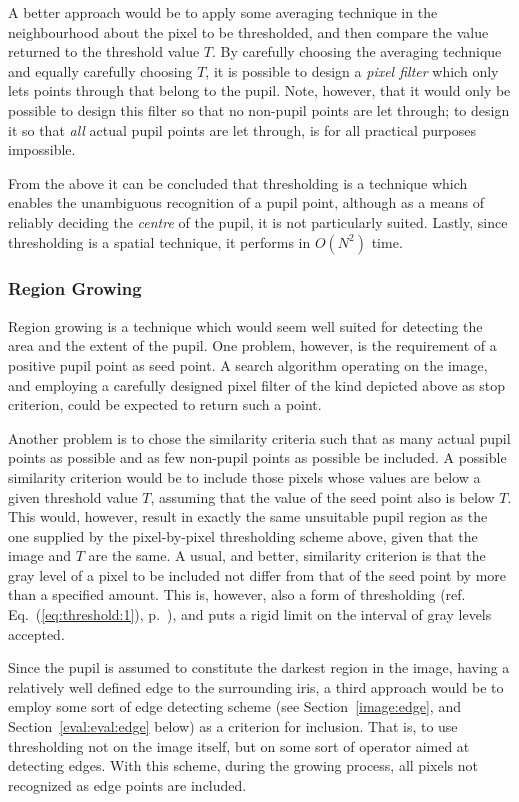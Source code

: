 A better approach would be to apply some averaging technique in the
neighbourhood about the pixel to be thresholded, and then compare the
value returned to the threshold value $T$.  By carefully choosing the
averaging technique and equally carefully choosing $T$, it is possible
to design a {\em pixel filter\/} which only lets points through that
belong to the pupil.  Note, however, that it would only be possible to
design this filter so that no non-pupil points are let through; to
design it so that {\em all\/} actual pupil points are let through, is
for all practical purposes impossible.

From the above it can be concluded that thresholding is a technique
which enables the unambiguous recognition of a pupil point, although
as a means of reliably deciding the {\em centre\/} of the pupil, it is
not particularly suited.  Lastly, since thresholding is a spatial
technique, it performs in $O(N^{2})$ time.

\subsubsection{Region Growing}

Region growing is a technique which would seem well suited for
detecting the area and the extent of the pupil.  One problem, however,
is the requirement of a positive pupil point as seed point.  A search
algorithm operating on the image, and employing a carefully designed
pixel filter of the kind depicted above as stop criterion, could be
expected to return such a point.

Another problem is to chose the similarity criteria such that as many
actual pupil points as possible and as few non-pupil points as
possible be included.  A possible similarity criterion would be to
include those pixels whose values are below a given threshold value
$T$, assuming that the value of the seed point also is below $T$.
This would, however, result in exactly the same unsuitable pupil
region as the one supplied by the pixel-by-pixel thresholding scheme
above, given that the image and $T$ are the same.  A usual, and
better, similarity criterion is that the gray level of a pixel to be
included not differ from that of the seed point by more than a
specified amount.  This is, however, also a form of thresholding (ref.
Eq.~(\ref{eq:threshold:1}), p.~\pageref{eq:threshold:1}), and puts a
rigid limit on the interval of gray levels accepted.

Since the pupil is assumed to constitute the darkest region in the
image, having a relatively well defined edge to the surrounding iris,
a third approach would be to employ some sort of edge detecting scheme
(see Section~\ref{image:edge}, and Section~\ref{eval:eval:edge}
below) as a criterion for inclusion.  That is, to use thresholding not
on the image itself, but on some sort of operator aimed at detecting
edges.  With this scheme, during the growing process, all pixels not
recognized as edge points are included.

